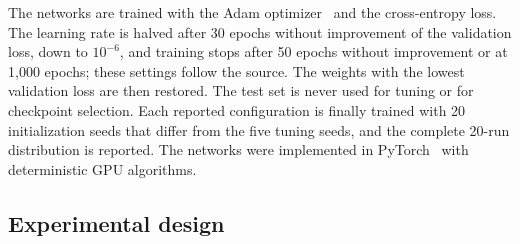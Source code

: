 The networks are trained with the Adam optimizer~\cite{kingma2015adam} and the
cross-entropy loss. The learning rate is halved after 30 epochs without
improvement of the validation loss, down to $10^{-6}$, and training stops after
50 epochs without improvement or at 1,000 epochs; these settings follow the
source. The weights with the lowest validation loss are then restored. The test
set is never used for tuning or for checkpoint selection. Each reported
configuration is finally trained with 20 initialization seeds that differ from
the five tuning seeds, and the complete 20-run distribution is reported. The
networks were implemented in PyTorch~\cite{paszke2019pytorch} with
deterministic GPU algorithms.

\subsection{Experimental design}
\label{sec:design}

